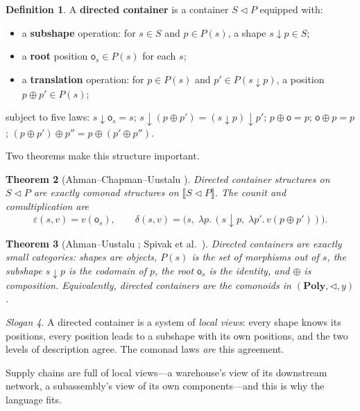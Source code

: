 \documentclass[11pt,a4paper]{article}
\newcommand{\Poly}{\mathbf{Poly}}
\newcommand{\cont}[2]{#1 \triangleleft #2}
\newcommand{\Ext}[1]{\llbracket #1 \rrbracket}
\newcommand{\dc}{\mathbin{\downarrow}}
\newcommand{\obs}{\mathsf{o}}
\theoremstyle{plain}
\newtheorem{theorem}{Theorem}[section]
\theoremstyle{definition}
\newtheorem{definition}[theorem]{Definition}
\theoremstyle{remark}
\newtheorem{slogan}[theorem]{Slogan}
\begin{document}
\begin{definition}\label{def:dcont}
A \textbf{directed container} \cite{ahman-chapman-uustalu} is a
container $\cont{S}{P}$ equipped with:
\begin{itemize}[nosep]
\item a \textbf{subshape} operation: for $s \in S$ and $p \in P(s)$, a
  shape $s \dc p \in S$;
\item a \textbf{root} position $\obs_s \in P(s)$ for each $s$;
\item a \textbf{translation} operation: for $p \in P(s)$ and
  $p' \in P(s \dc p)$, a position $p \oplus p' \in P(s)$;
\end{itemize}
subject to five laws:
$s \dc \obs_s = s$;\quad
$s \dc (p \oplus p') = (s \dc p) \dc p'$;\quad
$p \oplus \obs = p$;\quad
$\obs \oplus p = p$;\quad
$(p \oplus p') \oplus p'' = p \oplus (p' \oplus p'')$.
\end{definition}

Two theorems make this structure important.

\begin{theorem}[Ahman--Chapman--Uustalu \cite{ahman-chapman-uustalu}]
Directed container structures on $\cont{S}{P}$ are exactly comonad
structures on $\Ext{\cont{S}{P}}$. The counit and comultiplication are
\[
\varepsilon(s, v) = v(\obs_s),
\qquad
\delta(s, v) = \bigl(s,\; \lambda p.\, (s \dc p,\; \lambda p'.\, v(p \oplus p'))\bigr).
\]
\end{theorem}

\begin{theorem}[Ahman--Uustalu \cite{ahman-uustalu-categories};
Spivak et al.\ \cite{niu-spivak}]
Directed containers are exactly small categories: shapes are objects,
$P(s)$ is the set of morphisms \emph{out of} $s$, the subshape
$s \dc p$ is the codomain of $p$, the root $\obs_s$ is the identity,
and $\oplus$ is composition. Equivalently, directed containers are the
comonoids in $(\Poly, \triangleleft, y)$.
\end{theorem}

\begin{slogan}
A directed container is a system of \emph{local views}: every shape
knows its positions, every position leads to a subshape with its own
positions, and the two levels of description agree. The comonad laws
\emph{are} this agreement.
\end{slogan}

Supply chains are full of local views---a warehouse's view of its
downstream network, a subassembly's view of its own components---and
this is why the language fits.
\end{document}
